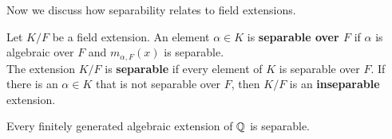 \documentclass{memoir}
\begin{document}
Now we discuss how separability relates to field extensions.
\begin{defn}[Separable]
	Let \(K / F\) be a field extension. An element \(\alpha  \in K\) is \textbf{separable over \(F\)} if \(\alpha \) is algebraic over \(F\) and \(m_{\alpha ,F}(x)\) is separable.\\

	The extension \(K / F\) is \textbf{separable} if every element of \(K\) is separable over \(F\). If there is an \(\alpha  \in K\) that is not separable over \(F\), then \(K / F\) is an \textbf{inseparable} extension.
\end{defn}

\begin{prop}
	Every finitely generated algebraic extension of \(\mathbb{Q}\) is separable.
\end{prop}
\end{document}
